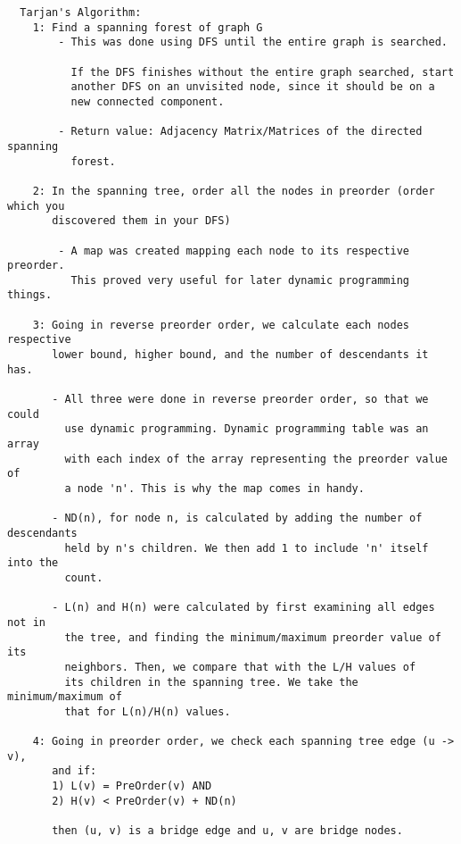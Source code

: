 \documentclass{article}
\begin{document}
  \begin{verbatim}
  Tarjan's Algorithm:
    1: Find a spanning forest of graph G
        - This was done using DFS until the entire graph is searched.

          If the DFS finishes without the entire graph searched, start 
          another DFS on an unvisited node, since it should be on a 
          new connected component.

        - Return value: Adjacency Matrix/Matrices of the directed spanning 
          forest.

    2: In the spanning tree, order all the nodes in preorder (order which you
       discovered them in your DFS)

        - A map was created mapping each node to its respective preorder.
          This proved very useful for later dynamic programming things.

    3: Going in reverse preorder order, we calculate each nodes respective
       lower bound, higher bound, and the number of descendants it has.

       - All three were done in reverse preorder order, so that we could
         use dynamic programming. Dynamic programming table was an array
         with each index of the array representing the preorder value of 
         a node 'n'. This is why the map comes in handy.

       - ND(n), for node n, is calculated by adding the number of descendants
         held by n's children. We then add 1 to include 'n' itself into the
         count.

       - L(n) and H(n) were calculated by first examining all edges not in
         the tree, and finding the minimum/maximum preorder value of its
         neighbors. Then, we compare that with the L/H values of 
         its children in the spanning tree. We take the minimum/maximum of
         that for L(n)/H(n) values.

    4: Going in preorder order, we check each spanning tree edge (u -> v),
       and if:
       1) L(v) = PreOrder(v) AND
       2) H(v) < PreOrder(v) + ND(n)

       then (u, v) is a bridge edge and u, v are bridge nodes.
  \end{verbatim}
\end{document}
